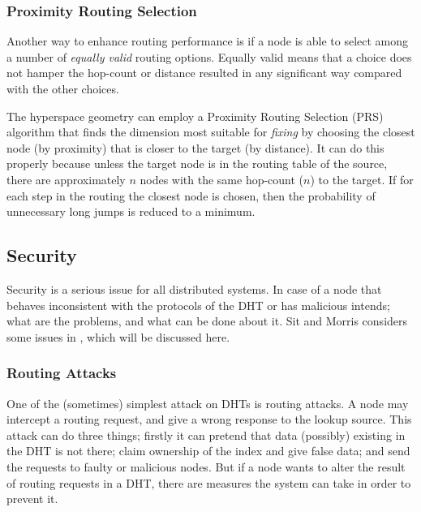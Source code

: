 \subsubsection{Proximity Routing Selection}
\label{theory:Routing:Proximity-Routing}

Another way to enhance routing performance is if a node is able to select among a number
 of \emph{equally valid} routing options. Equally valid means that a choice does not hamper
 the hop-count or distance resulted in any significant way compared with the other choices.

The hyperspace geometry can employ a Proximity Routing Selection (PRS)
 algorithm\cite{gummadi-03-impact-geometry} that
 finds the dimension most suitable for \emph{fixing} by choosing the closest node
 (by proximity) that is closer to the target (by distance). It can do this properly
 because unless the target node is in the routing table of the source, there are approximately
 $n$ nodes with the same hop-count ($n$) to the target. If for each step in the routing the
 closest node is chosen, then the probability of unnecessary long jumps is reduced to
 a minimum.




\subsection{Security}
\label{theory:Security}

Security is a serious issue for all distributed systems. In case of a node that
 behaves inconsistent with
 the protocols of the DHT or has malicious intends; what are the problems, and what can
 be done about it. Sit and Morris considers some issues in \cite{sit-02-security},
 which will be discussed here.
 
\subsubsection{Routing Attacks}

One of the (sometimes) simplest attack on DHTs is routing attacks. A node may intercept
 a routing request, and give a wrong response to the lookup source. This attack can do
 three things; firstly it can pretend that data (possibly) existing in the DHT is not there;
 claim ownership of the index and give false data; and send the requests to faulty or
 malicious nodes. But if a node wants to alter the result of routing requests in a DHT, there are
 measures the system can take in order to prevent it.

